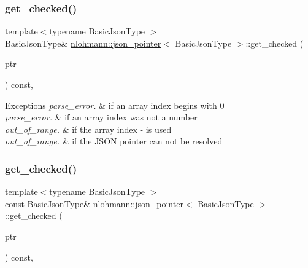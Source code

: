 \subsubsection{\texorpdfstring{get\+\_\+checked()}{get\_checked()}\hspace{0.1cm}{\footnotesize\ttfamily [1/2]}}
{\footnotesize\ttfamily template$<$typename Basic\+Json\+Type $>$ \\
Basic\+Json\+Type\& \hyperlink{classnlohmann_1_1json__pointer}{nlohmann\+::json\+\_\+pointer}$<$ Basic\+Json\+Type $>$\+::get\+\_\+checked (\begin{DoxyParamCaption}\item[{Basic\+Json\+Type $\ast$}]{ptr }\end{DoxyParamCaption}) const\hspace{0.3cm}{\ttfamily [inline]}, {\ttfamily [private]}}


\begin{DoxyExceptions}{Exceptions}
{\em parse\+\_\+error.} & if an array index begins with \textquotesingle{}0\textquotesingle{} \\
\hline
{\em parse\+\_\+error.} & if an array index was not a number \\
\hline
{\em out\+\_\+of\+\_\+range.} & if the array index \textquotesingle{}-\/\textquotesingle{} is used \\
\hline
{\em out\+\_\+of\+\_\+range.} & if the J\+S\+ON pointer can not be resolved \\
\hline
\end{DoxyExceptions}
\mbox{\label{classnlohmann_1_1json__pointer_a55a5bbbc3007e479607304a3e8cb9bf5}} 
\subsubsection{\texorpdfstring{get\+\_\+checked()}{get\_checked()}\hspace{0.1cm}{\footnotesize\ttfamily [2/2]}}
{\footnotesize\ttfamily template$<$typename Basic\+Json\+Type $>$ \\
const Basic\+Json\+Type\& \hyperlink{classnlohmann_1_1json__pointer}{nlohmann\+::json\+\_\+pointer}$<$ Basic\+Json\+Type $>$\+::get\+\_\+checked (\begin{DoxyParamCaption}\item[{const Basic\+Json\+Type $\ast$}]{ptr }\end{DoxyParamCaption}) const\hspace{0.3cm}{\ttfamily [inline]}, {\ttfamily [private]}}


